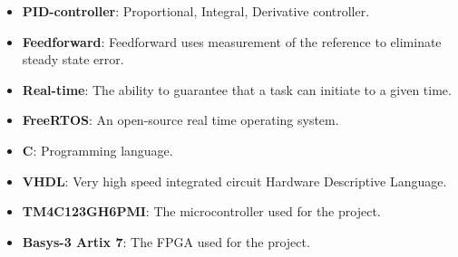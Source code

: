 \documentclass[../../main.tex]{subfiles}
\begin{document}
\begin{itemize}
    \item \textbf{PID-controller}: Proportional, Integral, Derivative controller.
    \item \textbf{Feedforward}: Feedforward uses measurement of the reference to eliminate steady state error.
    \item \textbf{Real-time}: The ability to guarantee that a task can initiate to a given time.
    \item \textbf{FreeRTOS}: An open-source real time operating system.
    \item \textbf{C}: Programming language. 
    \item \textbf{VHDL}: Very high speed integrated circuit Hardware Descriptive Language.
    
    \item \textbf{TM4C123GH6PMI}: The microcontroller used for the project.
    \item \textbf{Basys-3 Artix 7}: The FPGA used for the project.
     
\end{itemize}
\end{document}
